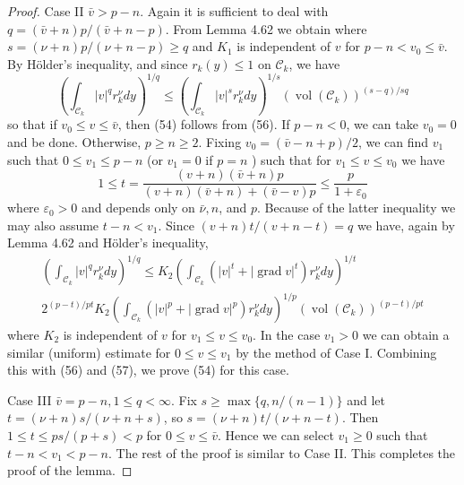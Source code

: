 \begin{proof}
  Case II $\bar{v}>p-n$. Again it is sufficient to deal with $q=(\bar{v}+n) p /(\bar{v}+n-p)$. From Lemma 4.62 we obtain
  where $s=(\nu+n) p /(\nu+n-p) \geq q$ and $K_1$ is independent of $v$ for $p-n<v_0 \leq \bar{v}$. By Hölder's inequality, and since $r_k(y) \leq 1$ on $\mathcal{C}_k$, we have
  \[
  \left(\int_{\mathcal{C}_k}|v|^q r_k^\nu d y\right)^{1 / q} \leq\left(\int_{\mathcal{C}_k}|v|^s r_k^\nu d y\right)^{1 / s}\left(\operatorname{vol}\left(\mathcal{C}_k\right)\right)^{(s-q) / s q}
  \]
  so that if $v_0 \leq v \leq \bar{v}$, then (54) follows from (56).
  If $p-n<0$, we can take $v_0=0$ and be done. Otherwise, $p \geq n \geq 2$. Fixing $v_0=(\bar{v}-n+p) / 2$, we can find $v_1$ such that $0 \leq v_1 \leq p-n$ (or $v_1=0$ if $p=n$ ) such that for $v_1 \leq v \leq v_0$ we have
  \[
  1 \leq t=\frac{(v+n)(\bar{v}+n) p}{(v+n)(\bar{v}+n)+(\bar{v}-v) p} \leq \frac{p}{1+\varepsilon_0}
  \]
  where $\varepsilon_0>0$ and depends only on $\bar{\nu}, n$, and $p$. Because of the latter inequality we may also assume $t-n<v_1$. Since $(v+n) t /(v+n-t)=q$ we have, again by Lemma 4.62 and Hölder's inequality,
  \[
  \begin{gathered}
  \left(\int_{\mathcal{C}_k}|v|^q r_k^\nu d y\right)^{1 / q} \leq K_2\left(\int_{\mathcal{C}_k}\left(|v|^t+|\operatorname{grad} v|^t\right) r_k^\nu d y\right)^{1 / t} \\
  2^{(p-t) / p t} K_2\left(\int_{\mathcal{C}_k}\left(|v|^p+|\operatorname{grad} v|^p\right) r_k^\nu d y\right)^{1 / p}\left(\operatorname{vol}\left(\mathcal{C}_k\right)\right)^{(p-t) / p t}
  \end{gathered}
  \]
  where $K_2$ is independent of $v$ for $v_1 \leq v \leq v_0$.
  In the case $v_1>0$ we can obtain a similar (uniform) estimate for $0 \leq v \leq v_1$ by the method of Case I. Combining this with (56) and (57), we prove (54) for this case.

  Case III $\bar{v}=p-n, 1 \leq q<\infty$. Fix $s \geq \max \{q, n /(n-1)\}$ and let $t=(\nu+n) s /(\nu+n+s)$, so $s=(\nu+n) t /(\nu+n-t)$. Then $1 \leq t \leq p s /(p+s)<p$ for $0 \leq v \leq \bar{v}$. Hence we can select $v_1 \geq 0$ such that $t-n<v_1<p-n$. The rest of the proof is similar to Case II. This completes the proof of the lemma.
\end{proof}


